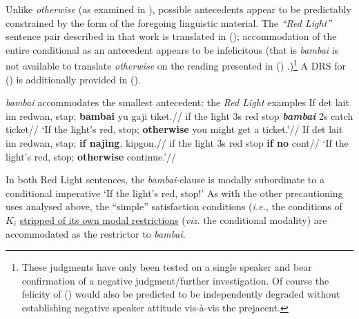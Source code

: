 \xe





Unlike \textit{otherwise} (as examined in \citealp{PhilKotek}), possible antecedents appear to be predictably constrained by the form of the foregoing linguistic material. The \textit{``Red Light''} sentence pair described in that work is translated in (\nextx); accommodation of the entire conditional as an antecedent appears to be infelicitous (that is \textit{bambai} is not available to translate \textit{otherwise} on the reading presented in () \citealp[\textit{cf.}][]{PhilKotek,Webber2003,Kruijff-Korbayova2001}.)\footnote{These judgments have only been tested on a single speaker and bear confirmation of a negative judgment/further investigation. Of course the felicity of () would also be predicted to be independently degraded without establishing negative speaker attitude vis-à-vis the prejacent.} A DRS for () is additionally provided in ().


	\pex \textit{bambai} accommodates the smallest antecedent: the \textit{Red Light} examples 
\a\begingl
\gla If det lait im redwan, stap; \textbf{bambai} yu gaji tiket.//
\glb if the light 3s red stop \textit{\textbf{bambai}} 2s catch ticket//
\glft`If the light's red, stop; \textbf{otherwise} you might get a ticket.'//
\endgl
\a\begingl\gla	If det lait im redwan, stap; \textbf{if najing}, kipgon.//
\glb if the light 3s red stop \textbf{if no} {\sc cont}//
\glft`If the light's red, stop; \textbf{otherwise} continue.'\trailingcitation{[GT~19032017]}//
\endgl\xe
{}

In both Red Light sentences, the \textit{bambai}-clause is modally subordinate to a conditional imperative `If the light's red, stop!' As with the other precautioning uses analysed above, the ``simple'' satisfaction conditions (\textit{i.e.}, the conditions of $ K_i $ \ul{stripped of its own modal restrictions} (\textit{viz.} the conditional modality)
 are accommodated as the restrictor to \textit{bambai}.%

